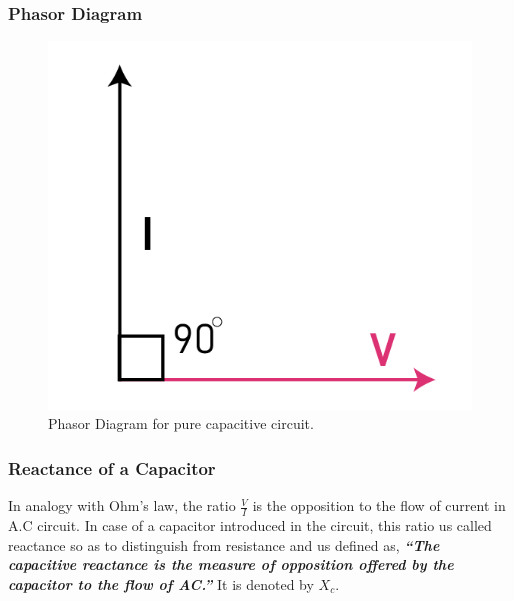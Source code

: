 \subsubsection{Phasor Diagram}
\begin{figure}[H]
    \centering
    \includegraphics[]{Images/Chapter-15/15.13}
    \caption{Phasor Diagram for pure capacitive circuit.}
    \label{fig:15.13}
\end{figure}
\subsubsection{Reactance of a Capacitor}
In analogy with Ohm’s law, the ratio $\frac{V}{I}$ is the opposition to
the flow of current in A.C circuit. In case of a capacitor introduced
in the circuit, this ratio us called reactance
so as to distinguish from resistance and us defined as,
\textit{\textbf{``The capacitive reactance is the measure of opposition
offered by the capacitor to the flow of AC.”}}
It is denoted by $X_{c}$.

